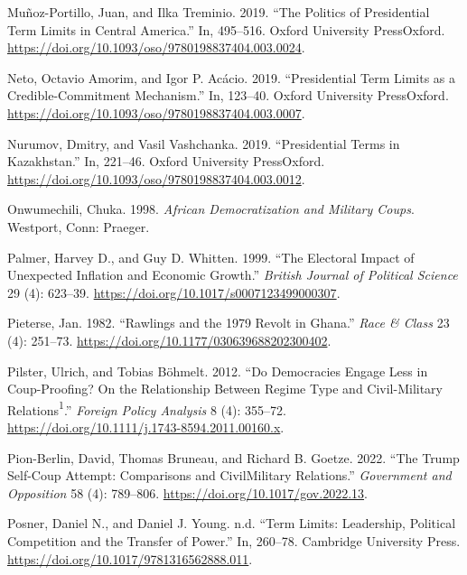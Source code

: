 \documentclass[
  12pt,
]{report}
\newlength{\cslhangindent}
\newenvironment{CSLReferences}[2] %
 {\begin{list}{}{%
  \setlength{\itemindent}{0pt}
  \setlength{\leftmargin}{0pt}
  \setlength{\parsep}{0pt}
  \ifodd #1
   \setlength{\leftmargin}{\cslhangindent}
   \setlength{\itemindent}{-1\cslhangindent}
  \fi
  \setlength{\itemsep}{#2\baselineskip}}}
 {\end{list}}
\begin{document}
\begin{CSLReferences}{1}{0}
Muñoz-Portillo, Juan, and Ilka Treminio. 2019. {``The Politics of
Presidential Term Limits in Central America.''} In, 495--516. Oxford
University PressOxford.
\url{https://doi.org/10.1093/oso/9780198837404.003.0024}.

Neto, Octavio Amorim, and Igor P. Acácio. 2019. {``Presidential Term
Limits as a Credible-Commitment Mechanism.''} In, 123--40. Oxford
University PressOxford.
\url{https://doi.org/10.1093/oso/9780198837404.003.0007}.

Nurumov, Dmitry, and Vasil Vashchanka. 2019. {``Presidential Terms in
Kazakhstan.''} In, 221--46. Oxford University PressOxford.
\url{https://doi.org/10.1093/oso/9780198837404.003.0012}.

Onwumechili, Chuka. 1998. \emph{African Democratization and Military
Coups}. Westport, Conn: Praeger.

Palmer, Harvey D., and Guy D. Whitten. 1999. {``The Electoral Impact of
Unexpected Inflation and Economic Growth.''} \emph{British Journal of
Political Science} 29 (4): 623--39.
\url{https://doi.org/10.1017/s0007123499000307}.

Pieterse, Jan. 1982. {``Rawlings and the 1979 Revolt in Ghana.''}
\emph{Race \& Class} 23 (4): 251--73.
\url{https://doi.org/10.1177/030639688202300402}.

Pilster, Ulrich, and Tobias Böhmelt. 2012. {``Do Democracies Engage Less
in Coup-Proofing? On the Relationship Between Regime Type and
Civil-Military Relations{\textsuperscript{1}}.''} \emph{Foreign Policy
Analysis} 8 (4): 355--72.
\url{https://doi.org/10.1111/j.1743-8594.2011.00160.x}.

Pion-Berlin, David, Thomas Bruneau, and Richard B. Goetze. 2022. {``The
Trump Self-Coup Attempt: Comparisons and Civil{\textendash}Military
Relations.''} \emph{Government and Opposition} 58 (4): 789--806.
\url{https://doi.org/10.1017/gov.2022.13}.

Posner, Daniel N., and Daniel J. Young. n.d. {``Term Limits: Leadership,
Political Competition and the Transfer of Power.''} In, 260--78.
Cambridge University Press.
\url{https://doi.org/10.1017/9781316562888.011}.


\end{CSLReferences}
\end{document}
